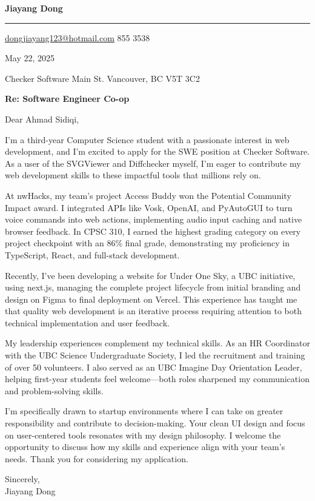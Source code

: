 \documentclass[letterpaper,12pt]{article}
\begin{document}
    \color{almost_black}
    
    {\fontsize{24pt}{28pt}\selectfont \textbf{Jiayang Dong} \par}
    \vspace{-5.3mm}
    \noindent\rule{\linewidth}{1.5pt}
    \vspace{3mm}
    \href{mailto:dongjiayang123@hotmail.com}{dongjiayang123@hotmail.com}  855 3538

    \vspace{-2.3mm}
    May 22, 2025

    Checker Software  Main St. \newline
    Vancouver, BC V5T 3C2

    \textbf{Re: Software Engineer Co-op}
    
    Dear Ahmad Sidiqi,
     
    I'm a third-year Computer Science student with a passionate interest in web development, and I'm excited to apply for the SWE position at Checker Software. As a user of the SVGViewer and Diffchecker myself, I'm eager to contribute my web development skills to these impactful tools that millions rely on.
    
    At nwHacks, my team's project Access Buddy won the Potential Community Impact award. I integrated APIs like Vosk, OpenAI, and PyAutoGUI to turn voice commands into web actions, implementing audio input caching and native browser feedback. In CPSC 310, I earned the highest grading category on every project checkpoint with an 86\% final grade, demonstrating my proficiency in TypeScript, React, and full-stack development.
    
    Recently, I’ve been developing a website for Under One Sky, a UBC initiative, using next.js, managing the complete project lifecycle from initial branding and design on Figma to final deployment on Vercel. This experience has taught me that quality web development is an iterative process requiring attention to both technical implementation and user feedback.
    
    My leadership experiences complement my technical skills. As an HR Coordinator with the UBC Science Undergraduate Society, I led the recruitment and training of over 50 volunteers. I also served as an UBC Imagine Day Orientation Leader, helping first-year students feel welcome—both roles sharpened my communication and problem-solving skills.
    
    I'm specifically drawn to startup environments where I can take on greater responsibility and contribute to decision-making. Your clean UI design and focus on user-centered tools resonates with my design philosophy. I welcome the opportunity to discuss how my skills and experience align with your team's needs. Thank you for considering my application.
    
    Sincerely, \\
    Jiayang Dong 
\end{document}
